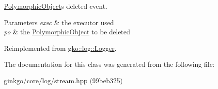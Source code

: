 \hyperlink{classgko_1_1PolymorphicObject}{Polymorphic\+Object}\textquotesingle{}s deleted event. 


\begin{DoxyParams}{Parameters}
{\em exec} & the executor used \\
\hline
{\em po} & the \hyperlink{classgko_1_1PolymorphicObject}{Polymorphic\+Object} to be deleted \\
\hline
\end{DoxyParams}


Reimplemented from \hyperlink{classgko_1_1log_1_1Logger}{gko\+::log\+::\+Logger}.



The documentation for this class was generated from the following file\+:\begin{DoxyCompactItemize}
\item 
ginkgo/core/log/stream.\+hpp (99beb325)\end{DoxyCompactItemize}
